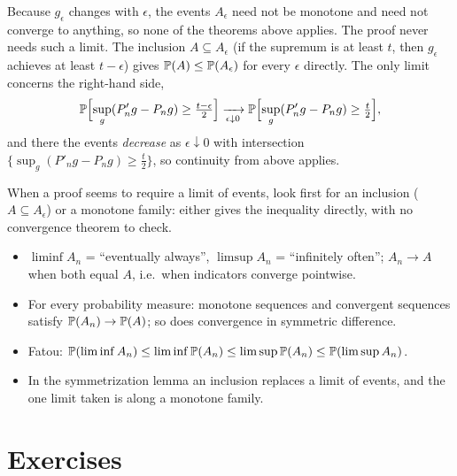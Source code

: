 \begin{notechapter}
\begin{pitfall}
Because $g_\epsilon$ changes with $\epsilon$, the events $A_\epsilon$ need not be
monotone and need not converge to anything, so none of the theorems above
applies. The proof never needs such a limit. The inclusion $A\subseteq A_\epsilon$
(if the supremum is at least $t$, then $g_\epsilon$ achieves at least $t-\epsilon$)
gives $\mathbb{P}(A)\leq\mathbb{P}(A_\epsilon)$ for every $\epsilon$ directly. The only limit
concerns the right-hand side,
\[
  \mathbb{P}\Bigl[\sup_g(P'_ng - P_ng)\geq\tfrac{t-\epsilon}2\Bigr]
  \xrightarrow[\epsilon\downarrow0]{}
  \mathbb{P}\Bigl[\sup_g(P'_ng - P_ng)\geq\tfrac t2\Bigr],
\]
and there the events \emph{decrease} as $\epsilon\downarrow0$ with intersection
$\{\sup_g(P'_ng - P_ng)\geq\frac t2\}$, so continuity from above applies.
\end{pitfall}

\begin{keyidea}
When a proof seems to require a limit of events, look first for an inclusion
($A\subseteq A_\epsilon$) or a monotone family: either gives the inequality
directly, with no convergence theorem to check.
\end{keyidea}

\begin{chaptersummary}
\begin{itemize}[nosep]
  \item $\liminf A_n$ = ``eventually always'', $\limsup A_n$ = ``infinitely
        often''; $A_n\to A$ when both equal $A$, i.e.\ when indicators converge
        pointwise.
  \item For every probability measure: monotone sequences and convergent
        sequences satisfy $\mathbb{P}(A_n)\to\mathbb{P}(A)$; so does convergence in
        symmetric difference.
  \item Fatou: $\mathbb{P}(\liminf A_n)\leq\liminf\mathbb{P}(A_n)\leq\limsup\mathbb{P}(A_n)\leq\mathbb{P}(\limsup A_n)$.
  \item In the symmetrization lemma an inclusion replaces a limit of events, and
        the one limit taken is along a monotone family.
\end{itemize}
\end{chaptersummary}

\section*{Exercises}


\end{notechapter}
